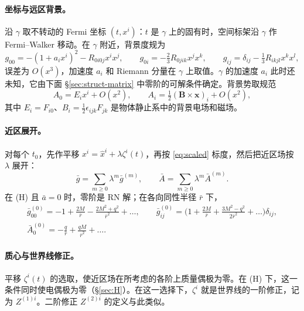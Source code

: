 \documentclass[11pt,a4paper]{ctexart}
\begin{document}
\paragraph{坐标与远区背景。}沿 $\gamma$ 取不转动的 Fermi 坐标 $(t,x^i)$：$t$ 是 $\gamma$ 上的固有时，空间标架沿 $\gamma$ 作 Fermi--Walker 移动。在 $\gamma$ 附近，背景度规为 \citep{ManasseMisner1963,PoissonPoundVega2011}
\begin{equation}
g_{00}=-(1+a_ix^i)^2-R_{0i0j}x^ix^j,\qquad g_{0i}=-\tfrac23R_{0jik}x^jx^k,\qquad g_{ij}=\delta_{ij}-\tfrac13R_{ikjl}x^kx^l,
\label{eq:fermiacc}
\end{equation}
误差为 $O(x^3)$，加速度 $a_i$ 和 Riemann 分量在 $\gamma$ 上取值。$\gamma$ 的加速度 $a_i$ 此时还未知，它由下面 \S\ref{sec:struct-matrix} 中零阶的可解条件确定。背景势取规范
\begin{equation}
A_0=E_ix^i+O(x^2),\qquad A_i=\tfrac12(\boldsymbol B\times\boldsymbol x)_i+O(x^2),
\label{eq:Abg}
\end{equation}
其中 $E_i=F_{i0}$、$B_i=\tfrac12\epsilon_{ijk}F_{jk}$ 是物体静止系中的背景电场和磁场。

\paragraph{近区展开。}对每个 $t_0$，先作平移 $x^i=\hat x^i+\lambda\zeta^i(t)$，再按 \eqref{eq:scaled} 标度，然后把近区场按 $\lambda$ 展开：
\begin{equation}
\bar g=\sum_{m\ge0}\lambda^m\bar g^{(m)},\qquad \bar A=\sum_{m\ge0}\lambda^m\bar A^{(m)}.
\label{eq:nearexp}
\end{equation}
在 (H) 且 $\bar a=0$ 时，零阶是 RN 解；在各向同性半径 $\bar r$ 下，
\begin{equation}
\begin{gathered}
\bar g^{(0)}_{00}=-1+\frac{2M}{\bar r}-\frac{2M^2+q^2}{\bar r^2}+\dots,\qquad
\bar g^{(0)}_{ij}=\Big(1+\frac{2M}{\bar r}+\frac{3M^2-q^2}{2\bar r^2}+\dots\Big)\delta_{ij},\\
\bar A^{(0)}_0=-\frac q{\bar r}+\frac{qM}{\bar r^2}+\dots .
\end{gathered}
\label{eq:RN}
\end{equation}

\paragraph{质心与世界线修正。}平移 $\zeta^i(t)$ 的选取，使近区场在所考虑的各阶上质量偶极为零。在 (H) 下，这一条件同时使电偶极为零（\S\ref{sec:H}）。在这一选择下，$\zeta^i$ 就是世界线的一阶修正，记为 $Z^{(1)i}$。二阶修正 $Z^{(2)i}$ 的定义与此类似。
\end{document}
